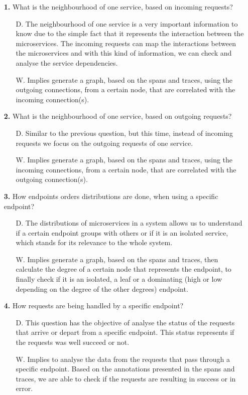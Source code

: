 \begin{itemize}
    \item[\textbf{1.}] What is the neighbourhood of one service, based on incoming requests? \begin{itemize}
        \item[D.] The neighbourhood of one service is a very important information to know due to the simple fact that it represents the interaction between the microservices. The incoming requests can map the interactions between the microservices and with this kind of information, we can check and analyse the service dependencies.
        \item[W.] Implies generate a graph, based on the spans and traces, using the outgoing connections, from a certain node, that are correlated with the incoming connection(s).
    \end{itemize}

    \item[\textbf{2.}] What is the neighbourhood of one service, based on outgoing requests?
    \begin{itemize}
        \item[D.] Similar to the previous question, but this time, instead of incoming requests we focus on the outgoing requests of one service. 
        \item[W.] Implies generate a graph, based on the spans and traces, using the incoming connections, from a certain node, that are correlated with the outgoing connection(s).
    \end{itemize}

    \item[\textbf{3.}] How endpoints orders distributions are done, when using a specific endpoint?
    \begin{itemize}
        \item[D.] The distributions of microservices in a system allows us to understand if a certain endpoint groups with others or if it is an isolated service, which stands for its relevance to the whole system.
        \item[W.] Implies generate a graph, based on the spans and traces, then calculate the degree of a certain node that represents the endpoint, to finally check if it is an isolated, a leaf or a dominating (high or low depending on the degree of the other degrees) endpoint.
    \end{itemize}
    
    \item[\textbf{4.}] How requests are being handled by a specific endpoint?
    \begin{itemize}
        \item[D.] This question has the objective of analyse the status of the requests that arrive or depart from a specific endpoint. This status represents if the requests was well succeed or not.
        \item[W.] Implies to analyse the data from the requests that pass through a specific endpoint. Based on the annotations presented in the spans and traces, we are able to check if the requests are resulting in success or in error. 
    \end{itemize}


\end{itemize}

